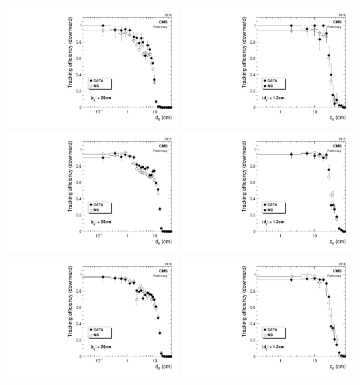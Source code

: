 \begin{figure}
\centering
\includegraphics[width=0.4\textwidth]{figures/tracking_eff/2016/Eff0vsD0.pdf}
\includegraphics[width=0.4\textwidth]{figures/tracking_eff/2016/Eff0vsZ0.pdf}
\\
\includegraphics[width=0.4\textwidth]{figures/tracking_eff/2017/Eff0vsD0.pdf}
\includegraphics[width=0.4\textwidth]{figures/tracking_eff/2017/Eff0vsZ0.pdf}
\\
\includegraphics[width=0.4\textwidth]{figures/tracking_eff/2018/Eff0vsD0.pdf}
\includegraphics[width=0.4\textwidth]{figures/tracking_eff/2018/Eff0vsZ0.pdf}

\end{figure}
